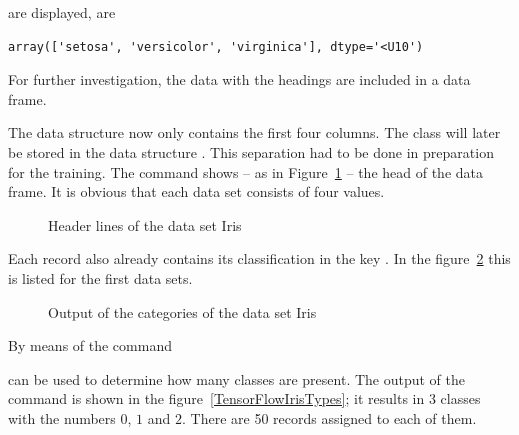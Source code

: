 \medskip

are displayed, are

\begin{lstlisting}[numbers=none]
    array(['setosa', 'versicolor', 'virginica'], dtype='<U10')
\end{lstlisting}

For further investigation, the data with the headings are included in a data frame.

\medskip



\medskip

The data structure  now only contains the first four columns. The class will later be stored in the data structure . This separation had to be done in preparation for the training. The command  shows -- as in Figure~\ref{TensorFlowHead} -- the head of the data frame. It is obvious that each data set consists of four values. 

\begin{figure}[H]
    \caption{Header lines of the data set Iris}\label{TensorFlowHead}
\end{figure}

Each record also already contains its classification in the key . In the figure~\ref{TensorFlowHeadType} this is listed for the first data sets.

\medskip



\medskip

\begin{figure}[H]
    \caption{Output of the categories of the data set Iris}\label{TensorFlowHeadType}
\end{figure}

By means of the command 

\medskip


\medskip

can be used to determine how many classes are present. The output of the command is shown in the figure~\ref{TensorFlowIrisTypes}; it results in 3 classes with the numbers $0$, $1$ and $2$. There are 50 records assigned to each of them.

